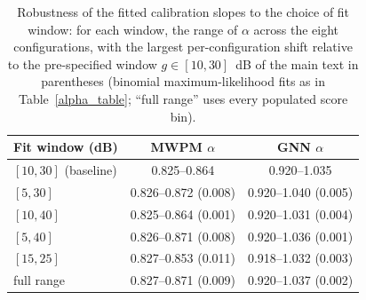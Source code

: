 \begin{table}
\centering
\begin{tabular}{l|cc}
\toprule
Fit window (dB) & MWPM $\alpha$ & GNN $\alpha$ \\
\hline
\midrule
$[10, 30]$ (baseline) & 0.825--0.864 & 0.920--1.035 \\
$[5, 30]$ & 0.826--0.872 (0.008) & 0.920--1.040 (0.005) \\
$[10, 40]$ & 0.825--0.864 (0.001) & 0.920--1.031 (0.004) \\
$[5, 40]$ & 0.826--0.871 (0.008) & 0.920--1.036 (0.001) \\
$[15, 25]$ & 0.827--0.853 (0.011) & 0.918--1.032 (0.003) \\
full range & 0.827--0.871 (0.009) & 0.920--1.037 (0.002) \\
\bottomrule
\end{tabular}
\caption{Robustness of the fitted calibration slopes to the choice of fit window: for each window, the range of $\alpha$ across the eight configurations, with the largest per-configuration shift relative to the pre-specified window $g \in [10, 30]$~dB of the main text in parentheses (binomial maximum-likelihood fits as in Table~\ref{alpha_table}; ``full range'' uses every populated score bin).}
\label{window_table}
\end{table}
